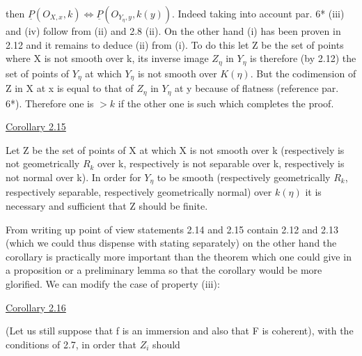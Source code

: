 
then $\underline{P}(O_{X,x}, k) \Leftrightarrow \underline{P}(O_{Y_\eta,y}, k(y))$. Indeed taking into account par.
6* (iii) and (iv) follow from (ii) and 2.8 (ii). On the other
hand (i) has been proven in 2.12 and it remains to deduce (ii)
from (i). To do this let Z be the set of points where X is not
smooth over k, its inverse image $Z_\eta$ in $Y_\eta$ is therefore (by 2.12)
the set of points of $Y_\eta$ at which $Y_\eta$ is not smooth over $K(\eta)$. But
the codimension of Z in X at x is equal to that of $Z_\eta$ in $Y_\eta$ at y
because of flatness (reference par. 6*). Therefore one is $>k$ if
the other one is such which completes the proof.

\uline{Corollary 2.15}

Let Z be the set of points of X at which X is not smooth over
k (respectively is not geometrically $R_k$ over k, respectively is not
separable over k, respectively is not normal over k). In order
for $Y_\eta$ to be smooth (respectively geometrically $R_k$, respectively
separable, respectively geometrically normal) over $k(\eta)$ it is
necessary and sufficient that Z should be finite.

From writing up point of view statements 2.14 and 2.15
contain 2.12 and 2.13 (which we could thus dispense with stating
separately) on the other hand the corollary is practically more
important than the theorem which one could give in a proposition
or a preliminary lemma so that the corollary would be more
glorified. We can modify the case of property (iii):

\uline{Corollary 2.16}

(Let us still suppose that f is an immersion and also that F
is coherent), with the conditions of 2.7, in order that $Z_i$ should

